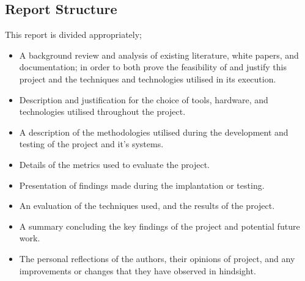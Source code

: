 \subsection{Report Structure}
This report is divided appropriately;

\begin{itemize}

\item A background review and analysis of existing literature, white papers, and
documentation; in order to both prove the feasibility of and justify this
project and the techniques and technologies utilised in its execution.

\item Description and justification for the choice of tools, hardware, and
technologies utilised throughout the project.

\item A description of the methodologies utilised during the
development and testing of the project and it's systems.

\item Details of the metrics used to evaluate the project.

\item Presentation of findings made during the implantation or testing.

\item An evaluation of the techniques used, and the results of the project.

\item A summary concluding the key findings of the project and potential future
work.

\item The personal reflections of the authors, their opinions of project, and
any improvements or changes that they have observed in hindsight.

\end{itemize}
